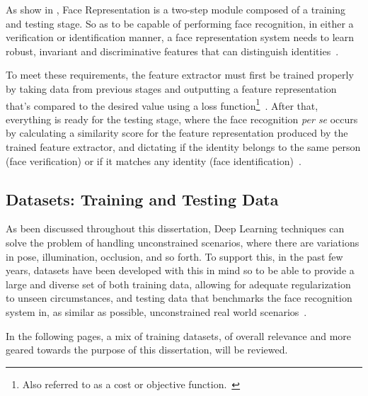 \documentclass[class=report, crop=false, a4paper, 12pt]{standalone}
\begin{document}
\par As show in , Face Representation is a two-step module composed of a training and testing stage. So as to be capable of performing face recognition, in either a verification or identification manner, a face representation system needs to learn robust, invariant and discriminative features that can distinguish identities~\autocite{ranjanDeepLearningUnderstanding2018}. 
\par To meet these requirements, the feature extractor must first be trained properly by taking data from previous stages and outputting a feature representation that's compared to the desired value using a loss function\footnote{Also referred to as a cost or objective function.~\autocite{lecunDeepLearning2015}}~\autocite{lecunDeepLearning2015, wangDeepFaceRecognition2021}. After that, everything is ready for the testing stage, where the face recognition \textit{per se} occurs by calculating a similarity score for the feature representation produced by the trained feature extractor, and dictating if the identity belongs to the same person (face verification) or if it matches any identity (face identification)~\autocite{ranjanDeepLearningUnderstanding2018}.



\subsection{Datasets: Training and Testing Data}
\par As been discussed throughout this dissertation, Deep Learning techniques can solve the problem of handling unconstrained scenarios, where there are variations in pose, illumination, occlusion, and so forth. To support this, in the past few years, datasets have been developed with this in mind so to be able to provide a large and diverse set of both training data, allowing for adequate regularization to unseen circumstances, and testing data that benchmarks the face recognition system in, as similar as possible, unconstrained real world scenarios~\autocite{duElementsEndtoendDeep2022}. 

\vspace{\baselineskip}
In the following pages, a mix of training datasets, of overall relevance and more geared towards the purpose of this dissertation, will be reviewed.
\end{document}
